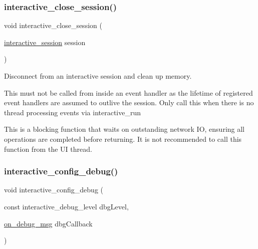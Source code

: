 \mbox{\label{group___interactivity_gadadf88b478e1c6e23e45c0b0187ed834}} 
\subsubsection{\texorpdfstring{interactive\+\_\+close\+\_\+session()}{interactive\_close\_session()}}
{\footnotesize\ttfamily void interactive\+\_\+close\+\_\+session (\begin{DoxyParamCaption}\item[{\mbox{\hyperlink{group___interactivity_ga6d8819d38b8dc8994a2299cf22a65a31}{interactive\+\_\+session}}}]{session }\end{DoxyParamCaption})}



Disconnect from an interactive session and clean up memory. 

This must not be called from inside an event handler as the lifetime of registered event handlers are assumed to outlive the session. Only call this when there is no thread processing events via {\ttfamily interactive\+\_\+run}

This is a blocking function that waits on outstanding network IO, ensuring all operations are completed before returning. It is not recommended to call this function from the UI thread.\mbox{\label{group___interactivity_gaf52c59ab6d2f401ca66aa6bd6d85ba7c}} 
\subsubsection{\texorpdfstring{interactive\+\_\+config\+\_\+debug()}{interactive\_config\_debug()}}
{\footnotesize\ttfamily void interactive\+\_\+config\+\_\+debug (\begin{DoxyParamCaption}\item[{const interactive\+\_\+debug\+\_\+level}]{dbg\+Level,  }\item[{\mbox{\hyperlink{group___interactivity_gac182f6e9e39863cd1671a69aa1ead684}{on\+\_\+debug\+\_\+msg}}}]{dbg\+Callback }\end{DoxyParamCaption})}



